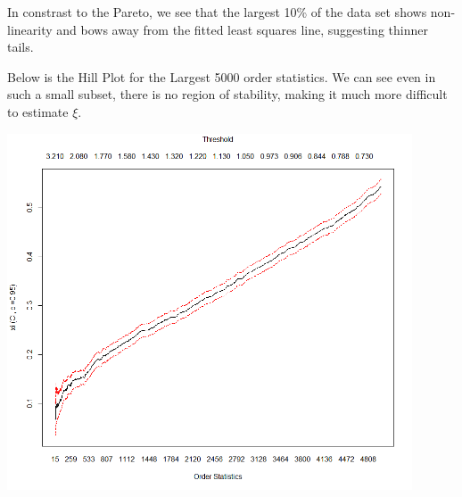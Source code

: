 \documentclass[letterpaper,12pt,titlepage,oneside,final]{book}
\begin{document}
 \pagebreak

In constrast to the Pareto, we see that the largest 10\% of the data set shows non-linearity and bows away from the fitted least squares line, suggesting thinner tails. 

Below is the Hill Plot for the Largest 5000 order statistics. We can see even in such a small subset, there is no region of stability, making it much more difficult to estimate $\xi$.

\noindent\begin{minipage}{\textwidth}
	\begin{minipage}{0.45\textwidth}
		\centering
		\includegraphics[width=0.9\textwidth]{NormHill}
	\end{minipage}
	\hfill
	\begin{minipage}[b]{0.45\textwidth}
		\centering
		\label{tab: NormHill} 
		\scriptsize
	\end{minipage}
\end{minipage}
\end{document}
